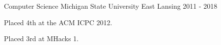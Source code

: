 
\begin{cventries}

  \cventry
    {Computer Science} %
    {Michigan State University} %
    {East Lansing} %
    {2011 - 2018} %
    {
      \begin{cvitems}
          \item {Placed 4th at the ACM ICPC 2012.}
          \item {Placed 3rd at MHacks 1.}
      \end{cvitems}
    }

\end{cventries}
